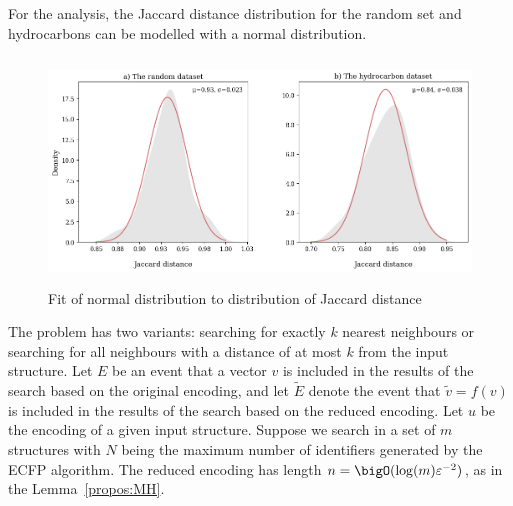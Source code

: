 For the analysis, the Jaccard distance distribution for the random set and hydrocarbons can be modelled with a normal distribution.
\begin{figure}[H]
    \centering
    \includegraphics[height=6cm]{figures/similarity_distributions_only.png}
    \caption{Fit of normal distribution to distribution of Jaccard distance}
    \label{fig:normal}
\end{figure}
The problem has two variants: searching for exactly \( k \) nearest neighbours or searching for all neighbours with a distance of at most \( k \) from the input structure. Let \( E \) be an event that a vector \( v \) is included in the results of the search based on the original encoding, and let \( \tilde{E} \) denote the event that \( \tilde{v} = f(v) \) is included in the results of the search based on the reduced encoding. Let \( u \) be the encoding of a given input structure. Suppose we search in a set of \( m \) structures with \( N \) being the maximum number of identifiers generated by the ECFP algorithm. The reduced encoding has length \( n = \bigO(\log(m)\eps^{-2}) \), as in the Lemma~\ref{propos:MH}.


